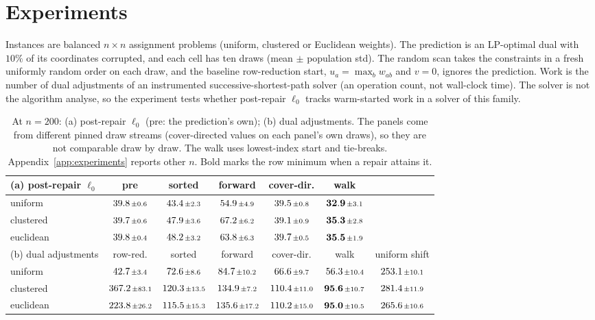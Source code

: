 \section{Experiments}\label{sec:exp}

Instances are balanced $n \times n$ assignment problems (uniform, clustered or Euclidean
weights). The prediction is an LP-optimal dual with
$10\%$ of its coordinates corrupted, and each cell has ten draws (mean $\pm$ population std). The
random scan takes the constraints in a fresh uniformly random order on each draw, and the baseline
row-reduction start, $u_a = \max_b w_{ab}$ and $v = 0$, ignores the prediction. Work
is the number of dual adjustments of an instrumented successive-shortest-path solver (an operation
count, not wall-clock time). The solver is not the algorithm
\citet{chen2022} analyse, so the experiment tests whether post-repair $\ell_0$ tracks
warm-started work in a solver of this family.

\begin{table}[t]
\centering
\caption{At $n = 200$: (a) post-repair $\ell_0$ (pre: the prediction's own); (b) dual adjustments.
The panels come from different pinned draw streams (cover-directed values on each panel's own
draws), so they are not comparable draw by draw. The walk uses lowest-index start and
tie-breaks. Appendix~\ref{app:experiments} reports other $n$. Bold marks the row minimum when a repair attains it.}
\label{tab:measure}
\footnotesize
\setlength{\tabcolsep}{4pt}
\begin{tabular*}{\linewidth}{@{\extracolsep{\fill}}lcccccc@{}}
\toprule
(a) post-repair $\ell_0$ & pre & sorted & forward & cover-dir. & walk & \\
\midrule
uniform   & $39.8{\scriptstyle\,\pm0.6}$ & $43.4{\scriptstyle\,\pm2.3}$ & $54.9{\scriptstyle\,\pm4.9}$ & $39.5{\scriptstyle\,\pm0.8}$ & $\mathbf{32.9}{\scriptstyle\,\pm3.1}$ & \\
clustered & $39.7{\scriptstyle\,\pm0.6}$ & $47.9{\scriptstyle\,\pm3.6}$ & $67.2{\scriptstyle\,\pm6.2}$ & $39.1{\scriptstyle\,\pm0.9}$ & $\mathbf{35.3}{\scriptstyle\,\pm2.8}$ & \\
euclidean & $39.8{\scriptstyle\,\pm0.4}$ & $48.2{\scriptstyle\,\pm3.2}$ & $63.8{\scriptstyle\,\pm6.3}$ & $39.7{\scriptstyle\,\pm0.5}$ & $\mathbf{35.5}{\scriptstyle\,\pm1.9}$ & \\
\midrule
(b) dual adjustments & row-red. & sorted & forward & cover-dir. & walk & uniform shift\\
\midrule
uniform   & $42.7{\scriptstyle\,\pm3.4}$ & $72.6{\scriptstyle\,\pm8.6}$ & $84.7{\scriptstyle\,\pm10.2}$ & $66.6{\scriptstyle\,\pm9.7}$ & $56.3{\scriptstyle\,\pm10.4}$ & $253.1{\scriptstyle\,\pm10.1}$\\
clustered & $367.2{\scriptstyle\,\pm83.1}$ & $120.3{\scriptstyle\,\pm13.5}$ & $134.9{\scriptstyle\,\pm7.2}$ & $110.4{\scriptstyle\,\pm11.0}$ & $\mathbf{95.6}{\scriptstyle\,\pm10.7}$ & $281.4{\scriptstyle\,\pm11.9}$\\
euclidean & $223.8{\scriptstyle\,\pm26.2}$ & $115.5{\scriptstyle\,\pm15.3}$ & $135.6{\scriptstyle\,\pm17.2}$ & $110.2{\scriptstyle\,\pm15.0}$ & $\mathbf{95.0}{\scriptstyle\,\pm10.5}$ & $265.6{\scriptstyle\,\pm10.6}$\\
\bottomrule
\end{tabular*}
\end{table}

